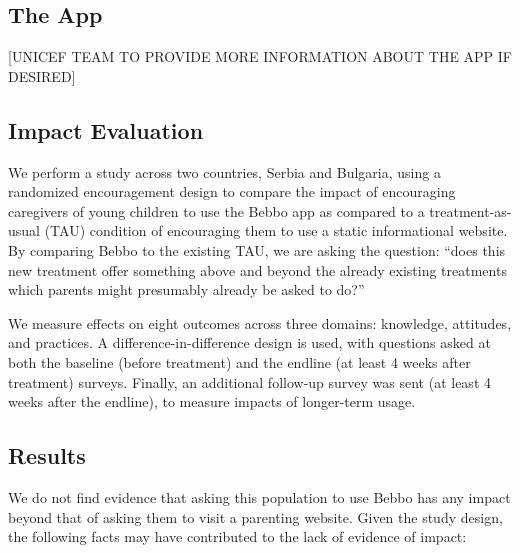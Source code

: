 \documentclass{article}
\begin{document}
\subsection*{The App}

[UNICEF TEAM TO PROVIDE MORE INFORMATION ABOUT THE APP IF DESIRED]

\subsection*{Impact Evaluation}

We perform a study across two countries, Serbia and Bulgaria, using a randomized encouragement design to compare the impact of encouraging caregivers of young children to use the Bebbo app as compared to a treatment-as-usual (TAU) condition of encouraging them to use a static informational website. By comparing Bebbo to the existing TAU, we are asking the question: “does this new treatment offer something above and beyond the already existing treatments which parents might presumably already be asked to do?”

We measure effects on eight outcomes across three domains: knowledge, attitudes, and practices. A difference-in-difference design is used, with questions asked at both the baseline (before treatment) and the endline (at least 4 weeks after treatment) surveys. Finally, an additional follow-up survey was sent (at least 4 weeks after the endline), to measure impacts of longer-term usage.

\subsection*{Results}

We do not find evidence that asking this population to use Bebbo has any impact beyond that of asking them to visit a parenting website. Given the study design, the following facts may have contributed to the lack of evidence of impact:
\end{document}
